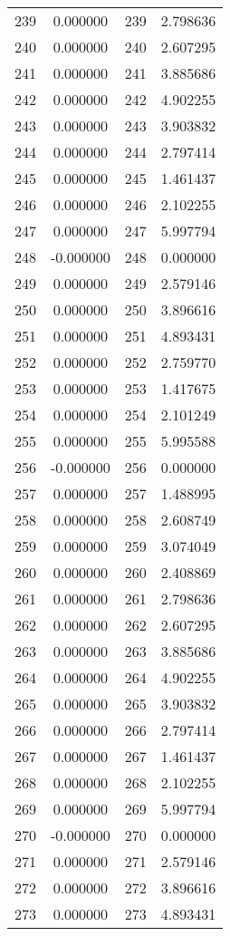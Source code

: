 \documentclass[12pt]{article}
\begin{document}
\begin{longtable}{@{}cccc@{}}
239 & 0.000000 & 239 & 2.798636 \\
240 & 0.000000 & 240 & 2.607295 \\
241 & 0.000000 & 241 & 3.885686 \\
242 & 0.000000 & 242 & 4.902255 \\
243 & 0.000000 & 243 & 3.903832 \\
244 & 0.000000 & 244 & 2.797414 \\
245 & 0.000000 & 245 & 1.461437 \\
246 & 0.000000 & 246 & 2.102255 \\
247 & 0.000000 & 247 & 5.997794 \\
248 & -0.000000 & 248 & 0.000000 \\
249 & 0.000000 & 249 & 2.579146 \\
250 & 0.000000 & 250 & 3.896616 \\
251 & 0.000000 & 251 & 4.893431 \\
252 & 0.000000 & 252 & 2.759770 \\
253 & 0.000000 & 253 & 1.417675 \\
254 & 0.000000 & 254 & 2.101249 \\
255 & 0.000000 & 255 & 5.995588 \\
256 & -0.000000 & 256 & 0.000000 \\
257 & 0.000000 & 257 & 1.488995 \\
258 & 0.000000 & 258 & 2.608749 \\
259 & 0.000000 & 259 & 3.074049 \\
260 & 0.000000 & 260 & 2.408869 \\
261 & 0.000000 & 261 & 2.798636 \\
262 & 0.000000 & 262 & 2.607295 \\
263 & 0.000000 & 263 & 3.885686 \\
264 & 0.000000 & 264 & 4.902255 \\
265 & 0.000000 & 265 & 3.903832 \\
266 & 0.000000 & 266 & 2.797414 \\
267 & 0.000000 & 267 & 1.461437 \\
268 & 0.000000 & 268 & 2.102255 \\
269 & 0.000000 & 269 & 5.997794 \\
270 & -0.000000 & 270 & 0.000000 \\
271 & 0.000000 & 271 & 2.579146 \\
272 & 0.000000 & 272 & 3.896616 \\
273 & 0.000000 & 273 & 4.893431 \\

\end{longtable}
\end{document}
